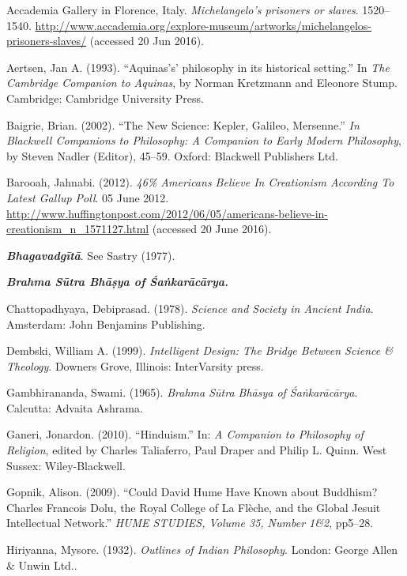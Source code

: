 \begin{thebibliography}{99}
\itemsep=2pt
Accademia Gallery in Florence, Italy. {\sl Michelangelo's prisoners or slaves}. 1520--1540. \url{http://www.accademia.org/explore-museum/artworks/michelangelos-prisoners-slaves/} (accessed 20 Jun 2016).

Aertsen, Jan A. (1993). ``Aquinas's' philosophy in its historical setting.'' In {\sl The Cambridge Companion to Aquinas}, by Norman Kretzmann and Eleonore Stump. Cambridge: Cambridge University Press.

Baigrie, Brian. (2002). ``The New Science: Kepler, Galileo, Mersenne.'' {\sl In Blackwell Companions to Philosophy: A Companion to Early Modern Philosophy}, by Steven Nadler (Editor), 45--59. Oxford: Blackwell Publishers Ltd.

Barooah, Jahnabi. (2012). {\sl 46\% Americans Believe In Creationism According To Latest Gallup Poll}. 05 June 2012. \url{http://www.huffingtonpost.com/2012/06/05/americans-believe-in-creationism_n_1571127.html} (accessed 20 June 2016).

{\sl\bfseries Bhagavadgītā}. See Sastry (1977).

{\sl\bfseries Brahma Sūtra Bhāṣya of Śaṅkarācārya.}

Chattopadhyaya, Debiprasad. (1978). {\sl Science and Society in Ancient India}. Amsterdam: John Benjamins Publishing.

Dembski, William A. (1999). {\sl Intelligent Design: The Bridge Between Science \& Theology}. Downers Grove, Illinois: InterVarsity press.

Gambhirananda, Swami. (1965). {\sl Brahma Sūtra Bhāsya of Śaṅkarācārya}. Calcutta: Advaita Ashrama.

Ganeri, Jonardon. (2010). ``Hinduism.'' In: {\sl A Companion to Philosophy of Religion}, edited by Charles Taliaferro, Paul Draper and Philip L. Quinn. West Sussex: Wiley-Blackwell.

Gopnik, Alison. (2009). ``Could David Hume Have Known about Buddhism? Charles Francois Dolu, the Royal College of La Flèche, and the Global Jesuit Intellectual Network.'' {\sl HUME STUDIES, Volume 35, Number 1\&2}, pp5--28.

Hiriyanna, Mysore. (1932). {\sl Outlines of Indian Philosophy}. London: George Allen \& Unwin Ltd..


\end{thebibliography}
